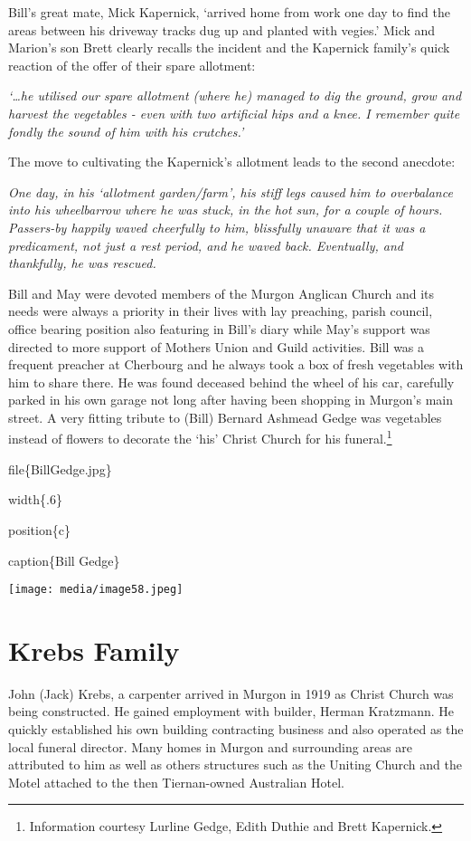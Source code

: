 Bill's great mate, Mick Kapernick, `arrived home from work one day to find the areas between his driveway tracks dug up and planted with vegies.' Mick and Marion's son Brett clearly recalls the incident and the Kapernick family's quick reaction of the offer of their spare allotment:

\emph{`\ldots he utilised our spare allotment (where he) managed to dig the ground, grow and harvest the vegetables - even with two artificial hips and a knee. I remember quite fondly the sound of him with his crutches.'}

The move to cultivating the Kapernick's allotment leads to the second anecdote:

\emph{One day, in his `allotment garden/farm', his stiff legs caused him to overbalance into his wheelbarrow where he was stuck, in the hot sun, for a couple of hours. Passers-by happily waved cheerfully to him, blissfully unaware that it was a predicament, not just a rest period, and he waved back. Eventually, and thankfully, he was rescued.}

Bill and May were devoted members of the Murgon Anglican Church and its needs were always a priority in their lives with lay preaching, parish council, office bearing position also featuring in Bill's diary while May's support was directed to more support of Mothers Union and Guild activities. Bill was a frequent preacher at Cherbourg and he always took a box of fresh vegetables with him to share there. He was found deceased behind the wheel of his car, carefully parked in his own garage not long after having been shopping in Murgon's main street. A very fitting tribute to (Bill) Bernard Ashmead Gedge was vegetables instead of flowers to decorate the `his' Christ Church for his funeral.\footnote{Information courtesy Lurline Gedge, Edith Duthie and Brett Kapernick.}

file\{BillGedge.jpg\}

width\{.6\}

position\{c\}

caption\{Bill Gedge\}

\texttt{[image: media/image58.jpeg]}

\hypertarget{krebs-family}{%
\section{Krebs Family}\label{krebs-family}}

John (Jack) Krebs, a carpenter arrived in Murgon in 1919 as Christ Church was being constructed. He gained employment with builder, Herman Kratzmann. He quickly established his own building contracting business and also operated as the local funeral director. Many homes in Murgon and surrounding areas are attributed to him as well as others structures such as the Uniting Church and the Motel attached to the then Tiernan-owned Australian Hotel.

